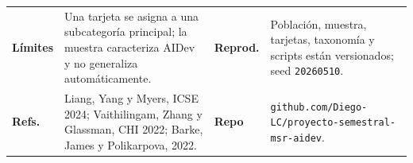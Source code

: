 \documentclass[final,t]{beamer}
\begin{document}
\begin{frame}[t]
\begin{center}
\begin{minipage}{0.94\textwidth}
{\vspace{0.10cm}
\begin{tabularx}{\linewidth}{>{\bfseries}p{4.8cm}Y>{\bfseries}p{4.8cm}Y}
Límites & Una tarjeta se asigna a una subcategoría principal; la muestra caracteriza AIDev y no generaliza automáticamente. & Reprod. & Población, muestra, tarjetas, taxonomía y scripts están versionados; seed \texttt{20260510}. \\
Refs. & Liang, Yang y Myers, ICSE 2024; Vaithilingam, Zhang y Glassman, CHI 2022; Barke, James y Polikarpova, 2022. & Repo & \texttt{github.com/Diego-LC/proyecto-semestral-msr-aidev}. \\
\end{tabularx}
}

\end{minipage}
\end{center}

\end{frame}
\end{document}
